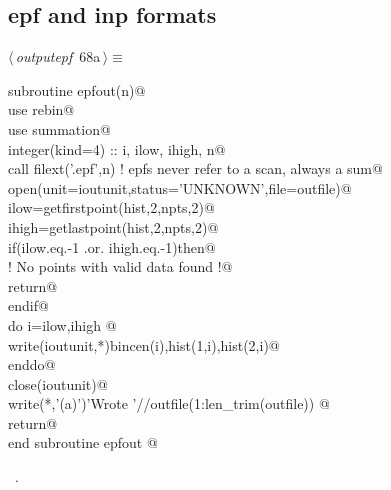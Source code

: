 \documentclass[10pt,a4paper,notitlepage]{article}
\begin{document}
\subsection{epf and inp formats}

\begin{flushleft} \small
\begin{minipage}{\linewidth}\label{scrap72}\raggedright\small
{} $\langle\,${\it outputepf}\nobreak\ {\footnotesize {68a}}$\,\rangle\equiv$
\vspace{-1ex}
\begin{list}{}{} \item
\mbox{}\verb@      subroutine epfout(n)@\\
\mbox{}\verb@      use rebin@\\
\mbox{}\verb@      use summation@\\
\mbox{}\verb@      integer(kind=4) :: i, ilow, ihigh, n@\\
\mbox{}\verb@      call filext('.epf',n) ! epfs never refer to a scan, always a sum@\\
\mbox{}\verb@      open(unit=ioutunit,status='UNKNOWN',file=outfile)@\\
\mbox{}\verb@      ilow=getfirstpoint(hist,2,npts,2)@\\
\mbox{}\verb@      ihigh=getlastpoint(hist,2,npts,2)@\\
\mbox{}\verb@      if(ilow.eq.-1 .or. ihigh.eq.-1)then@\\
\mbox{}\verb@       ! No points with valid data found !@\\
\mbox{}\verb@       return@\\
\mbox{}\verb@      endif@\\
\mbox{}\verb@      do i=ilow,ihigh     @\\
\mbox{}\verb@        write(ioutunit,*)bincen(i),hist(1,i),hist(2,i)@\\
\mbox{}\verb@      enddo@\\
\mbox{}\verb@      close(ioutunit)@\\
\mbox{}\verb@      write(*,'(a)')'Wrote '//outfile(1:len_trim(outfile))      @\\
\mbox{}\verb@      return@\\
\mbox{}\verb@      end subroutine epfout                                               @{\NWsep}
\end{list}
\vspace{-1.5ex}
\footnotesize
\begin{list}{}{\setlength{\itemsep}{-\parsep}\setlength{\itemindent}{-\leftmargin}}
\item \NWtxtMacroRefIn\ .

\item{}
\end{list}
\end{minipage}\vspace{4ex}
\end{flushleft}
\end{document}
